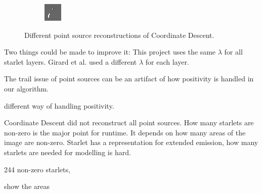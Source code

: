 \begin{figure}[h]
\begin{subfigure}[b]{0.2\linewidth}
	\end{subfigure}
	\begin{subfigure}[b]{0.2\linewidth}
		\includegraphics[width=\linewidth]{./chapters/20.results/mixed/problems/point3.png}
	\end{subfigure}
	\caption{Different point source reconstructions of Coordinate Descent.}
	\label{results:mixed:points}
\end{figure}

Two things could be made to improve it: This project uses the same $\lambda$ for all starlet layers. Girard et al.\cite{girard2015sparse} used a different $\lambda$ for each layer. 

The trail issue of point sources can be an artifact of how positivity is handled in our algorithm.

different way of handling positivity. 



Coordinate Descent did not reconstruct all point sources. How many starlets are non-zero is the major point for runtime. It depends on how many areas of the image are non-zero. Starlet has a representation for extended emission, how many starlets are needed for modelling is hard.

244 non-zero starlets, 

show the areas


